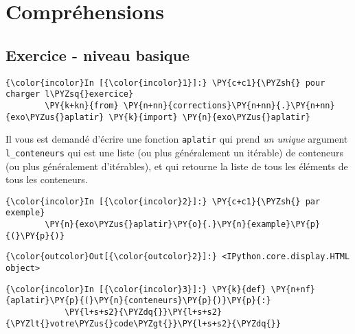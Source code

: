     
    
    
    

    

    \hypertarget{compruxe9hensions}{%
\section{Compréhensions}\label{compruxe9hensions}}

    \hypertarget{exercice---niveau-basique}{%
\subsection{Exercice - niveau basique}\label{exercice---niveau-basique}}

    \begin{Verbatim}[commandchars=\\\{\}]
{\color{incolor}In [{\color{incolor}1}]:} \PY{c+c1}{\PYZsh{} pour charger l\PYZsq{}exercice}
        \PY{k+kn}{from} \PY{n+nn}{corrections}\PY{n+nn}{.}\PY{n+nn}{exo\PYZus{}aplatir} \PY{k}{import} \PY{n}{exo\PYZus{}aplatir}
\end{Verbatim}


    Il vous est demandé d'écrire une fonction \texttt{aplatir} qui prend
\emph{un unique} argument \texttt{l\_conteneurs} qui est une liste (ou
plus généralement un itérable) de conteneurs (ou plus généralement
d'itérables), et qui retourne la liste de tous les éléments de tous les
conteneurs.

    \begin{Verbatim}[commandchars=\\\{\}]
{\color{incolor}In [{\color{incolor}2}]:} \PY{c+c1}{\PYZsh{} par exemple}
        \PY{n}{exo\PYZus{}aplatir}\PY{o}{.}\PY{n}{example}\PY{p}{(}\PY{p}{)}
\end{Verbatim}


\begin{Verbatim}[commandchars=\\\{\}]
{\color{outcolor}Out[{\color{outcolor}2}]:} <IPython.core.display.HTML object>
\end{Verbatim}
            
    \begin{Verbatim}[commandchars=\\\{\}]
{\color{incolor}In [{\color{incolor}3}]:} \PY{k}{def} \PY{n+nf}{aplatir}\PY{p}{(}\PY{n}{conteneurs}\PY{p}{)}\PY{p}{:}
            \PY{l+s+s2}{\PYZdq{}}\PY{l+s+s2}{\PYZlt{}votre\PYZus{}code\PYZgt{}}\PY{l+s+s2}{\PYZdq{}}
\end{Verbatim}


